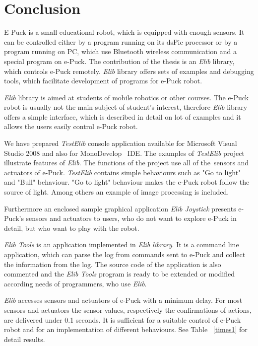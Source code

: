 \chapter{Conclusion} \label{chap:conclusion}
	E-Puck is a small educational robot, which is equipped with enough sensors. 
        It can be controlled either
	by a program running on its dsPic processor or by a program running on PC, 
	which use Bluetooth wireless communication and 
	a special program on e-Puck.
	The contribution of the thesis is an {\it Elib} library, which controls e-Puck remotely.
	{\it Elib} library offers sets of examples and debugging tools, 
        which facilitate development of programs for e-Puck robot.

	{\it Elib} library is aimed at students of mobile robotics or other courses.
	The e-Puck robot is usually not the main subject of student's interest, therefore
	{\it Elib} library offers a simple interface, 
        which is described in detail on lot of examples and 
	it allows the users easily control e-Puck robot.

	We have prepared {\it TestElib} console application available for Microsoft Visual Studio 2008 \cite{msvs} and also
	for MonoDevelop~\cite{monodev} IDE. The examples of {\it TestElib} project illustrate features of {\it Elib}.
	The functions of the project use all of the~sensors and actuators of e-Puck.
	{\it TestElib} contains simple behaviours such as "Go to light" and "Bull" behaviour. "Go to light" behaviour
	makes the e-Puck robot follow the source of light.
	Among others an example of image processing is included.

	Furthermore an enclosed sample graphical application {\it Elib Joystick}  
        presents e-Puck's sensors and actuators
	to users, who do not want to explore e-Puck in detail, 
        but who want to play with the robot.

	{\it Elib Tools} is an application implemented in {\it Elib library}. It is a command line application, 
	which can parse the log from commands sent to e-Puck and collect the information from the log.
	The source code of the application is also commented and the {\it Elib Tools} program is  ready to be extended 
	or modified according needs of programmers, who use {\it Elib}.

	{\it Elib} accesses sensors and actuators of e-Puck with a minimum delay. 
	For most sensors and actuators the sensor values, respectively the confirmations of actions,
	are delivered under 0.1 seconds. 
	It is sufficient for a suitable control of e-Puck robot and for an implementation of different behaviours.
	See Table ~\ref{times1} for detail results.

